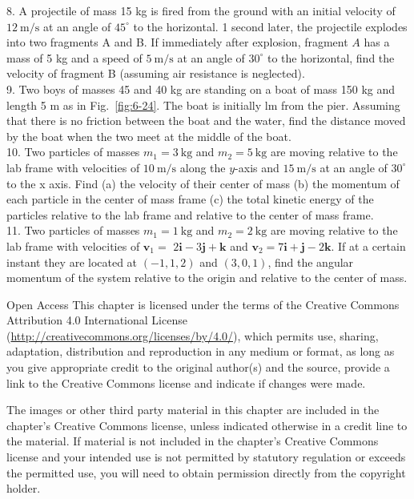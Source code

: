 \documentclass[10pt]{article}
\numberwithin{equation}{section}
\begin{document}
8. A projectile of mass 15 kg is fired from the ground with an initial velocity of $12 \mathrm{~m} / \mathrm{s}$ at an angle of $45^{\circ}$ to the horizontal. 1 second later, the projectile explodes into two fragments A and B. If immediately after explosion, fragment $A$ has a mass of 5 kg and a speed of $5 \mathrm{~m} / \mathrm{s}$ at an angle of $30^{\circ}$ to the horizontal, find the velocity of fragment B (assuming air resistance is neglected).\\
9. Two boys of masses 45 and 40 kg are standing on a boat of mass 150 kg and length 5 m as in Fig.~\ref{fig:6-24}. The boat is initially lm from the pier. Assuming that there is no friction between the boat and the water, find the distance moved by the boat when the two meet at the middle of the boat.\\
10. Two particles of masses $m_{1}=3 \mathrm{~kg}$ and $m_{2}=5 \mathrm{~kg}$ are moving relative to the lab frame with velocities of $10 \mathrm{~m} / \mathrm{s}$ along the $y$-axis and $15 \mathrm{~m} / \mathrm{s}$ at an angle of $30^{\circ}$ to the x axis. Find (a) the velocity of their center of mass (b) the momentum of each particle in the center of mass frame (c) the total kinetic energy of the particles relative to the lab frame and relative to the center of mass frame.\\
11. Two particles of masses $m_{1}=1 \mathrm{~kg}$ and $m_{2}=2 \mathrm{~kg}$ are moving relative to the lab frame with velocities of $\mathbf{v}_{1}=$ $2 \mathbf{i}-3 \mathbf{j}+\mathbf{k}$ and $\mathbf{v}_{2}=7 \mathbf{i}+\mathbf{j}-2 \mathbf{k}$. If at a certain instant they are located at $(-1,1,2)$ and $(3,0,1)$, find the angular momentum of the system relative to the origin and relative to the center of mass.

Open Access This chapter is licensed under the terms of the Creative Commons Attribution 4.0 International License (\href{http://creativecommons.org/licenses/by/4.0/}{http://creativecommons.org/licenses/by/4.0/}), which permits use, sharing, adaptation, distribution and reproduction in any medium or format, as long as you give appropriate credit to the original author(s) and the source, provide a link to the Creative Commons license and indicate if changes were made.

The images or other third party material in this chapter are included in the chapter's Creative Commons license, unless indicated otherwise in a credit line to the material. If material is not included in the chapter's Creative Commons license and your intended use is not permitted by statutory regulation or exceeds the permitted use, you will need to obtain permission directly from the copyright holder.
\end{document}
